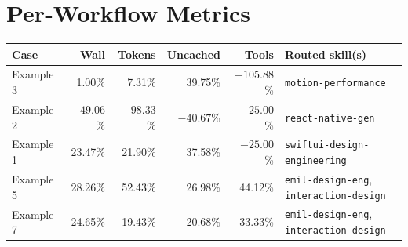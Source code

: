 \documentclass[10pt,twocolumn]{article}
\newcommand{\code}[1]{\texttt{\small #1}}
\begin{document}
\section{Per-Workflow Metrics}

\begin{tabularx}{\textwidth}{@{}lrrrrX@{}}
\toprule
Case & Wall & Tokens & Uncached & Tools & Routed skill(s) \\
\midrule
Example 3 & 1.00\% & 7.31\% & 39.75\% & $-105.88$\% &
\code{motion-performance} \\
Example 2 & $-49.06$\% & $-98.33$\% & $-40.67$\% & $-25.00$\% &
\code{react-native-gen} \\
Example 1 & 23.47\% & 21.90\% & 37.58\% & $-25.00$\% &
\code{swiftui-design-engineering} \\
Example 5 & 28.26\% & 52.43\% & 26.98\% & 44.12\% &
\code{emil-design-eng}, \code{interaction-design} \\
Example 7 & 24.65\% & 19.43\% & 20.68\% & 33.33\% &
\code{emil-design-eng}, \code{interaction-design} \\
\bottomrule
\end{tabularx}
\end{document}
